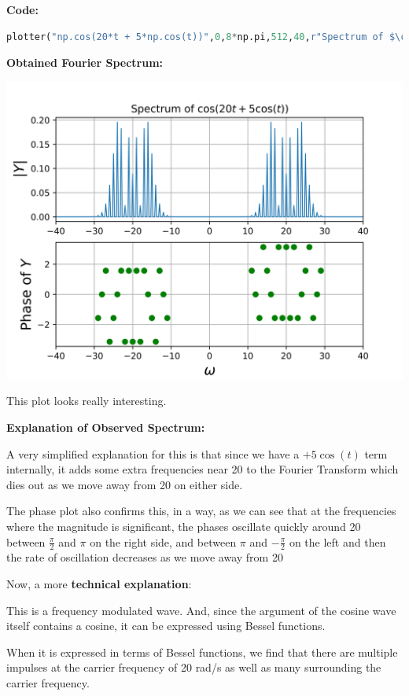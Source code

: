 \documentclass[12pt]{article}
\begin{document}
\textbf{Code:}

\begin{lstlisting}[language=Python]
plotter("np.cos(20*t + 5*np.cos(t))",0,8*np.pi,512,40,r"Spectrum of $\cos(20t + 5\cos(t))$",sig=True,save=True,fignum=7)
\end{lstlisting}

\textbf{Obtained Fourier Spectrum:}
\begin{center}
    \includegraphics[scale=1]{images/fig7.png}
\end{center}
This plot looks really interesting.

\textbf{Explanation of Observed Spectrum:}

A very simplified explanation for this is that since we have a $+5\cos(t)$ term internally, it adds some extra frequencies near 20 to the Fourier Transform which dies out as we move away from 20 on either side.

The phase plot also confirms this, in a way, as we can see that at the frequencies where the magnitude is significant, the phases oscillate quickly around 20 between $\frac{\pi}{2}$ and $\pi$ on the right side, and between $\pi$ and $-\frac{\pi}{2}$ on the left and then the rate of oscillation decreases as we move away from 20

Now, a more \textbf{technical explanation}:

This is a frequency modulated wave. And, since the argument of the cosine wave itself contains a cosine, it can be expressed using Bessel functions.

When it is expressed in terms of Bessel functions, we find that there are multiple impulses at the carrier frequency  of 20 rad/s as well as many surrounding the carrier frequency.
\end{document}
